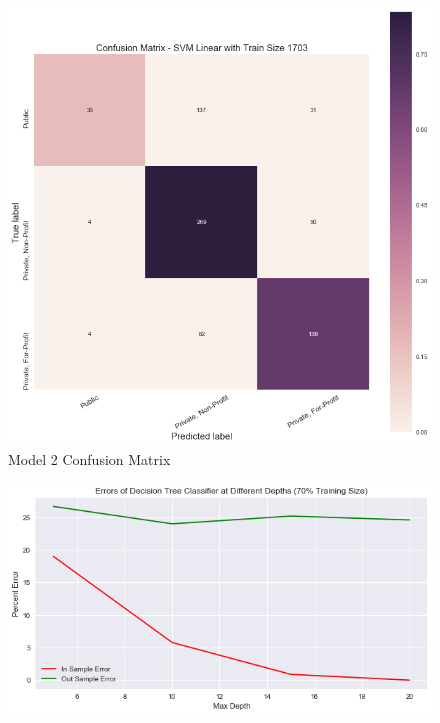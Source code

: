 \documentclass[10pt,twocolumn]{article}
\begin{document}
\begin{table}[ht]
\begin{figure}[!t]
  \begin{center}
    \includegraphics[width=6in]{MODEL2_trainsize70.png}
  \end{center}

  \caption{\small Model 2 Confusion Matrix}
  \label{fig-1}
\end{figure}

\begin{figure}[!t]
  \begin{center}
    \includegraphics[width=\textwidth,height=\textheight,keepaspectratio]{decision_tree_error_1.png}
  \end{center}


\end{figure}
\end{table}
\end{document}
